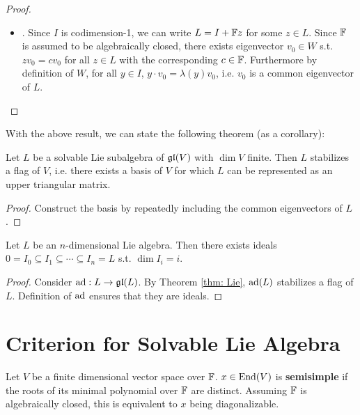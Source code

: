 \documentclass{article}
\begin{document}
\begin{proof}
\begin{itemize}
        \item {}. Since $I$ is codimension-1, we can write $L = I + \mathbb{F} z$ for some $z \in L$. Since $\mathbb{F}$ is assumed to be algebraically closed, there exists eigenvector $v_0 \in W$ s.t. $z v_0 = c v_0$ for all $z \in L$ with the corresponding $c \in \mathbb{F}$. Furthermore by definition of $W$, for all $y \in I$, $y \cdot v_0 = \lambda(y) v_0$, i.e. $v_0$ is a common eigenvector of $L$. 
    \end{itemize}
\end{proof}

With the above result, we can state the following theorem (as a corollary):

\begin{theorem}[Lie]\label{thm: Lie}
    Let $L$ be a solvable Lie subalgebra of $\mathfrak{gl}(V)$ with $\dim V$ finite. Then $L$ stabilizes a flag of $V$, i.e. there exists a basis of $V$ for which $L$ can be represented as an upper triangular matrix.
\end{theorem}

\begin{proof}
    Construct the basis by repeatedly including the common eigenvectors of $L$.
\end{proof}

\begin{corollary}
    Let $L$ be an $n$-dimensional Lie algebra. Then there exists ideals $0 = I_0 \subseteq I_1 \subseteq \cdots \subseteq I_n = L$ s.t. $\dim I_i = i$.
\end{corollary}

\begin{proof}
    Consider $\operatorname{ad}: L \to \mathfrak{gl}(L)$. By Theorem \ref{thm: Lie}, $\operatorname{ad}(L)$ stabilizes a flag of $L$. Definition of $\operatorname{ad}$ ensures that they are ideals.
\end{proof}

\section{Criterion for Solvable Lie Algebra}

\begin{definition}
    Let $V$ be a finite dimensional vector space over $\mathbb{F}$. $x \in \mathrm{End}(V)$ is \textbf{semisimple} if the roots of its minimal polynomial over $\mathbb{F}$ are distinct. Assuming $\mathbb{F}$ is algebraically closed, this is equivalent to $x$ being diagonalizable.
\end{definition}
\end{document}
